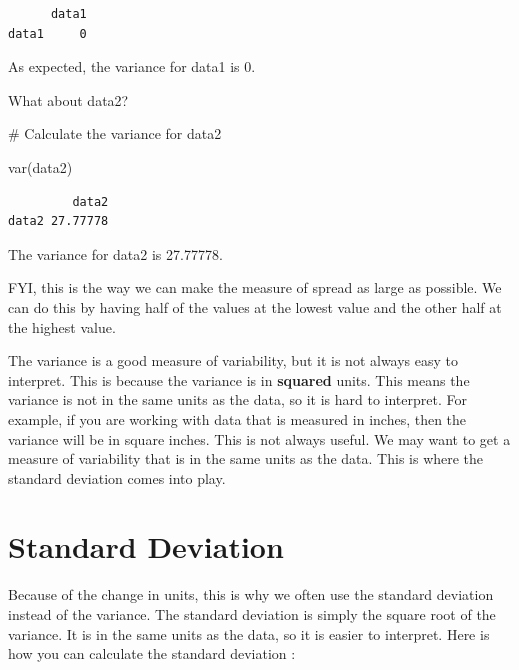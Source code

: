 \documentclass[
  letterpaper,
  DIV=11,
  numbers=noendperiod]{scrreprt}
\newenvironment{Shaded}{\begin{snugshade}}{\end{snugshade}}
\newcommand{\CommentTok}[1]{\textcolor[rgb]{0.37,0.37,0.37}{#1}}
\newcommand{\FunctionTok}[1]{\textcolor[rgb]{0.28,0.35,0.67}{#1}}
\newcommand{\NormalTok}[1]{\textcolor[rgb]{0.00,0.23,0.31}{#1}}
\begin{document}
\begin{verbatim}
      data1
data1     0
\end{verbatim}

As expected, the variance for data1 is 0.

What about data2?

\begin{Shaded}
\begin{Highlighting}[]
\CommentTok{\# Calculate the variance for data2}

\FunctionTok{var}\NormalTok{(data2)}
\end{Highlighting}
\end{Shaded}

\begin{verbatim}
         data2
data2 27.77778
\end{verbatim}

The variance for data2 is 27.77778.

FYI, this is the way we can make the measure of spread as large as
possible. We can do this by having half of the values at the lowest
value and the other half at the highest value.

The variance is a good measure of variability, but it is not always easy
to interpret. This is because the variance is in \textbf{squared} units.
This means the variance is not in the same units as the data, so it is
hard to interpret. For example, if you are working with data that is
measured in inches, then the variance will be in square inches. This is
not always useful. We may want to get a measure of variability that is
in the same units as the data. This is where the standard deviation
comes into play.

\section*{Standard Deviation}\label{standard-deviation}


Because of the change in units, this is why we often use the standard
deviation instead of the variance. The standard deviation is simply the
square root of the variance. It is in the same units as the data, so it
is easier to interpret. Here is how you can calculate the standard
deviation :
\end{document}
